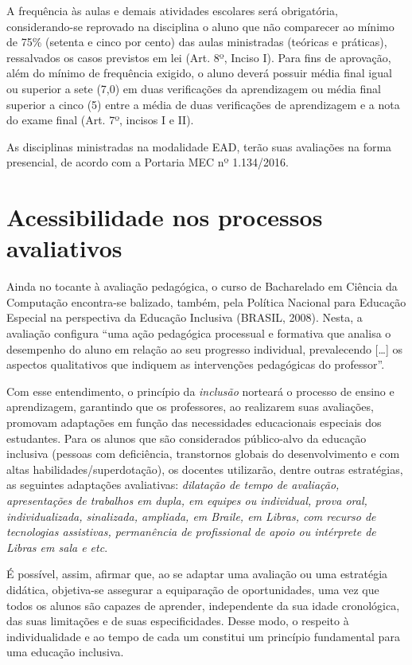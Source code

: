 \documentclass[
	12pt,				%
	openright,			%
  oneside,     %
	a4paper,			%
	chapter=TITLE,		%
	english,			%
	french,				%
	spanish,			%
	brazil				%
	]{abntex2}
\begin{document}
A frequência às aulas e demais atividades escolares será obrigatória, conside\-ran\-do-se reprovado na disciplina o aluno que não comparecer ao mínimo de 75\% (setenta e cinco por cento) das aulas ministradas (teóricas e práticas), ressalvados os casos previstos em lei (Art. 8º, Inciso I). Para fins de aprovação, além do mínimo de frequência exigido, o aluno deverá possuir média final igual ou superior a sete (7,0) em duas verificações da aprendizagem ou média final superior a cinco (5) entre a média de duas verificações de aprendizagem e a nota do exame final (Art. 7º, incisos I e II).

As disciplinas ministradas na modalidade EAD, terão suas avaliações na forma presencial, de acordo com a Portaria MEC nº 1.134/2016.

\section{Acessibilidade nos processos avaliativos}

Ainda no tocante à avaliação pedagógica, o curso de Bacharelado em Ciência da Computação encontra-se balizado, também, pela Política Nacional para Educação Especial na perspectiva da Educação Inclusiva (BRASIL, 2008). Nesta, a avaliação configura “uma ação pedagógica processual e formativa que analisa o desempenho do aluno em relação ao seu progresso individual, prevalecendo [\ldots] os aspectos qualitativos que indiquem as intervenções pedagógicas do professor”.

Com esse entendimento, o princípio da \textit{inclusão} norteará o processo de ensino e aprendizagem, garantindo que os professores, ao realizarem suas avaliações, promovam adaptações em função das necessidades educacionais especiais dos estudantes. Para os alunos que são considerados público-alvo da educação inclusiva (pessoas com deficiência, transtornos globais do desenvolvimento e com altas habilidades/superdotação), os docentes utilizarão, dentre outras estratégias, as seguintes adaptações avaliativas: \textit{dilatação de tempo de avaliação, apresentações de trabalhos em dupla, em equipes ou individual, prova oral, individualizada, sinalizada, ampliada, em Braile, em Libras, com recurso de tecnologias assistivas, permanência de profissional de apoio ou intérprete de Libras em sala e etc}.

É possível, assim, afirmar que, ao se adaptar uma avaliação ou uma estratégia didática, objetiva-se assegurar a equiparação de oportunidades, uma vez que todos os alunos são capazes de aprender, independente da sua idade cronológica, das suas limitações e de suas especificidades. Desse modo, o respeito à individualidade e ao tempo de cada um constitui um princípio fundamental para uma educação inclusiva.
\end{document}
